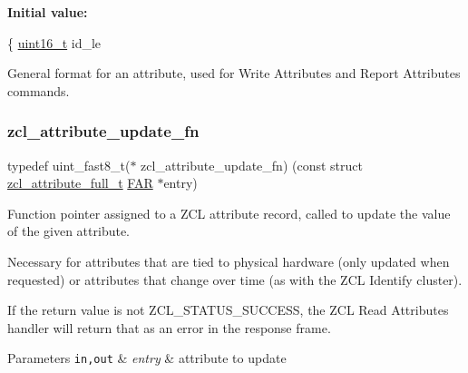 {\bfseries Initial value\+:}
\begin{DoxyCode}
\{
   \hyperlink{group__hal__dos_ga5a8b2dc9e45a9ee81a94ef304fb62505}{uint16\_t}  id\_le
\end{DoxyCode}


General format for an attribute, used for Write Attributes and Report Attributes commands. 

\mbox{\label{group__zcl_gace94cfc3f22379fa08a5b8de8c6977f6}} 
\subsubsection{\texorpdfstring{zcl\+\_\+attribute\+\_\+update\+\_\+fn}{zcl\_attribute\_update\_fn}}
{\footnotesize\ttfamily typedef uint\+\_\+fast8\+\_\+t($\ast$ zcl\+\_\+attribute\+\_\+update\+\_\+fn) (const struct \hyperlink{structzcl__attribute__full__t}{zcl\+\_\+attribute\+\_\+full\+\_\+t} \hyperlink{group__hal_gaef060b3456fdcc093a7210a762d5f2ed}{F\+AR} $\ast$entry)}



Function pointer assigned to a Z\+CL attribute record, called to update the value of the given attribute. 

Necessary for attributes that are tied to physical hardware (only updated when requested) or attributes that change over time (as with the Z\+CL Identify cluster).

If the return value is not Z\+C\+L\+\_\+\+S\+T\+A\+T\+U\+S\+\_\+\+S\+U\+C\+C\+E\+SS, the Z\+CL Read Attributes handler will return that as an error in the response frame.


\begin{DoxyParams}[1]{Parameters}
\mbox{\tt in,out}  & {\em entry} & attribute to update\\
\hline
\end{DoxyParams}

